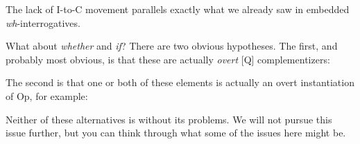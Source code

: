 \documentclass{article}
\begin{document}
The lack of I-to-C movement parallels exactly what we already saw in embedded \emph{wh}-interrogatives.

What about \emph{whether} and \emph{if}?
There are two obvious hypotheses.
The first, and probably most obvious, is that these are actually \emph{overt} [Q] complementizers:
\begin{exe}
\end{exe}
The second is that one or both of these elements is actually an overt instantiation of Op, for example:
\begin{exe}
\end{exe}
Neither of these alternatives is without its problems.
We will not pursue this issue further, but you can think through what some of the issues here might be. 
\end{document}
